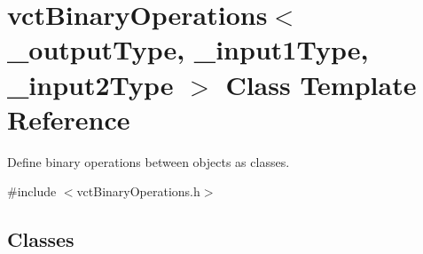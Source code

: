\hypertarget{classvct_binary_operations}{}\section{vct\+Binary\+Operations$<$ \+\_\+output\+Type, \+\_\+input1\+Type, \+\_\+input2\+Type $>$ Class Template Reference}
\label{classvct_binary_operations}


Define binary operations between objects as classes.  




{\ttfamily \#include $<$vct\+Binary\+Operations.\+h$>$}

\subsection*{Classes}
